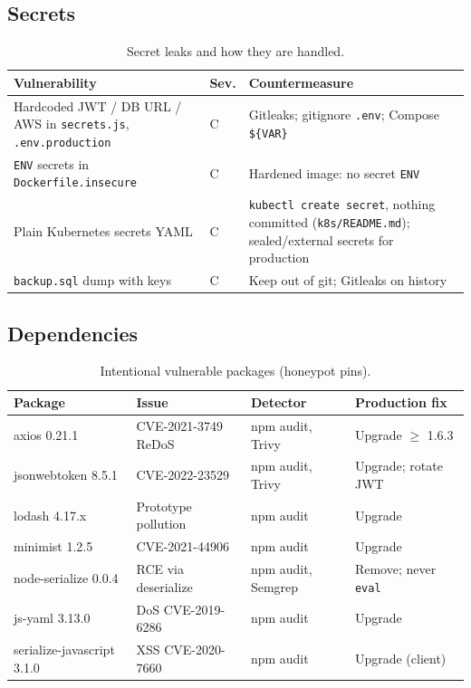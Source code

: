 \documentclass[11pt,a4paper]{article}
\newcommand{\thc}[1]{\textcolor{headtxt}{\textbf{#1}}}
\begin{document}
\subsection{Secrets}
\begin{table}[H]
\centering
\caption{Secret leaks and how they are handled.}
\begin{tabularx}{\textwidth}{@{}Y l Y@{}}
\toprule
{}\thc{Vulnerability} & \thc{Sev.} & \thc{Countermeasure} \\
\midrule
Hardcoded JWT / DB URL / AWS in \texttt{secrets.js}, \texttt{.env.production} & C & Gitleaks; gitignore \texttt{.env}; Compose \texttt{\$\{VAR\}} \\
\texttt{ENV} secrets in \texttt{Dockerfile.insecure} & C & Hardened image: no secret \texttt{ENV} \\
Plain Kubernetes secrets YAML & C & \texttt{kubectl create secret}, nothing committed (\texttt{k8s/README.md}); sealed/external secrets for production \\
\texttt{backup.sql} dump with keys & C & Keep out of git; Gitleaks on history \\
\bottomrule
\end{tabularx}
\end{table}

\subsection{Dependencies}
\begin{table}[H]
\centering
\caption{Intentional vulnerable packages (honeypot pins).}
\begin{tabularx}{\textwidth}{@{}l Y l Y@{}}
\toprule
{}\thc{Package} & \thc{Issue} & \thc{Detector} & \thc{Production fix} \\
\midrule
axios 0.21.1 & CVE-2021-3749 ReDoS & npm audit, Trivy & Upgrade $\ge$ 1.6.3 \\
jsonwebtoken 8.5.1 & CVE-2022-23529 & npm audit, Trivy & Upgrade; rotate JWT \\
lodash 4.17.x & Prototype pollution & npm audit & Upgrade \\
minimist 1.2.5 & CVE-2021-44906 & npm audit & Upgrade \\
node-serialize 0.0.4 & RCE via deserialize & npm audit, Semgrep & Remove; never \texttt{eval} \\
js-yaml 3.13.0 & DoS CVE-2019-6286 & npm audit & Upgrade \\
serialize-javascript 3.1.0 & XSS CVE-2020-7660 & npm audit & Upgrade (client) \\
\bottomrule
\end{tabularx}
\end{table}
\end{document}
